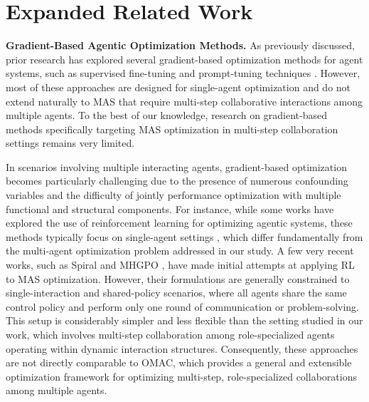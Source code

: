 \section{Expanded Related Work}\label{sec:exp_related}


\noindent \textbf{Gradient-Based Agentic Optimization Methods.} As previously discussed, prior research has explored several gradient-based optimization methods for agent systems, such as supervised fine-tuning \cite{api_bank} and prompt-tuning techniques \cite{dsp}. However, most of these approaches are designed for single-agent optimization and do not extend naturally to MAS that require multi-step collaborative interactions among multiple agents. To the best of our knowledge, research on gradient-based methods specifically targeting MAS optimization in multi-step collaboration settings remains very limited.

In scenarios involving multiple interacting agents, gradient-based optimization becomes particularly challenging due to the presence of numerous confounding variables and the difficulty of jointly performance optimization with multiple functional and structural components. For instance, while some works have explored the use of reinforcement learning for optimizing agentic systems, these methods typically focus on single-agent settings \cite{shao2024deepseekmath, qian2025toolrl}, which differ fundamentally from the multi-agent optimization problem addressed in our study.
A few very recent works, such as Spiral \cite{liu2025spiral} and MHGPO \cite{chen2025heterogeneous}, have made initial attempts at applying RL to MAS optimization. However, their formulations are generally constrained to single-interaction and shared-policy scenarios, where all agents share the same control policy and perform only one round of communication or problem-solving. This setup is considerably simpler and less flexible than the setting studied in our work, which involves multi-step collaboration among role-specialized agents operating within dynamic interaction structures. Consequently, these approaches are not directly comparable to OMAC, which provides a general and extensible optimization framework for optimizing multi-step, role-specialized collaborations among multiple agents.



